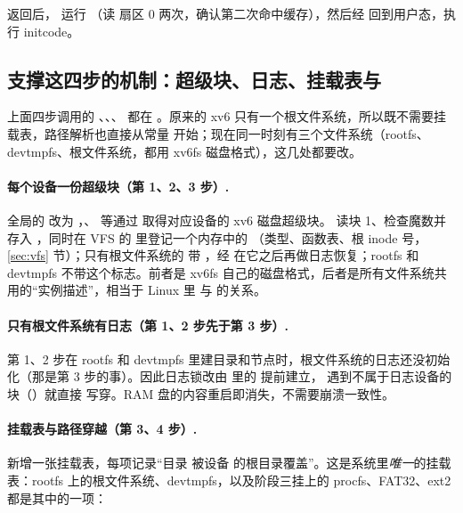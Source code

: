  返回后， 运行 （读  扇区 0 两次，确认第二次命中缓存），然后经  回到用户态，执行 initcode。

\subsection{支撑这四步的机制：超级块、日志、挂载表与 }
\label{sec:ns-mech}

上面四步调用的 、、、 都在 。原来的 xv6 只有一个根文件系统，所以既不需要挂载表，路径解析也直接从常量  开始；现在同一时刻有三个文件系统（rootfs、devtmpfs、根文件系统，都用 xv6fs 磁盘格式），这几处都要改。

\paragraph{每个设备一份超级块（第 1、2、3 步）.} 全局的  改为 ，、 等通过  取得对应设备的 xv6 磁盘超级块。 读块 1、检查魔数并存入 ，同时在 VFS 的  里登记一个内存中的 （类型、函数表、根 inode 号，\ref{sec:vfs} 节）；只有根文件系统的  带 ，经  在它之后再做日志恢复；rootfs 和 devtmpfs 不带这个标志。前者是 xv6fs 自己的磁盘格式，后者是所有文件系统共用的“实例描述”，相当于 Linux 里  与  的关系。

\paragraph{只有根文件系统有日志（第 1、2 步先于第 3 步）.} 第 1、2 步在 rootfs 和 devtmpfs 里建目录和节点时，根文件系统的日志还没初始化（那是第 3 步的事）。因此日志锁改由  里的  提前建立， 遇到不属于日志设备的块（）就直接  写穿。RAM 盘的内容重启即消失，不需要崩溃一致性。

\paragraph{挂载表与路径穿越（第 3、4 步）.}  新增一张挂载表，每项记录“目录  被设备  的根目录覆盖”。这是系统里\emph{唯一}的挂载表：rootfs 上的根文件系统、devtmpfs，以及阶段三挂上的 procfs、FAT32、ext2 都是其中的一项：

